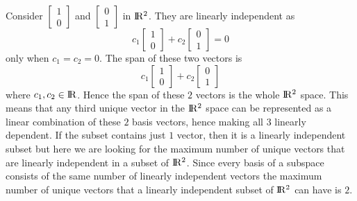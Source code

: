 \documentclass[solution,addpoints,12pt]{exam}
\newenvironment{Solution}{\begin{solution}}{\end{solution}}
\begin{document}
\begin{questions}
    \begin{Solution}
    Consider $\begin{bmatrix}
        1 \\ 0
    \end{bmatrix}$ and $\begin{bmatrix}
        0 \\ 1
    \end{bmatrix}$ in ${\rm I\!R^{2}}$. They are linearly independent as 
    \[c_{1}\begin{bmatrix}
        1 \\ 0
    \end{bmatrix} + c_{2}\begin{bmatrix}
        0 \\ 1
    \end{bmatrix} = 0\] only when $c_{1} = c_{2} = 0$. The span of these two vectors is 
    \[c_{1}\begin{bmatrix}
        1 \\ 0
    \end{bmatrix} + c_{2}\begin{bmatrix}
        0 \\ 1
    \end{bmatrix}\] where $c_{1},c_{2} \in {\rm I\!R}$. Hence the span of these $2$ vectors is the whole ${\rm I\!R^{2}}$ space. This means that any third unique vector in the ${\rm I\!R^{2}}$ space can be represented as a linear combination of these $2$ basis vectors, hence making all $3$ linearly dependent. If the subset contains just $1$ vector, then it is a linearly independent subset but here we are looking for the maximum number of unique vectors that are linearly independent in a subset of ${\rm I\!R^{2}}$. Since every basis of a subspace consists of the same number of linearly independent vectors the maximum number of unique vectors that a linearly independent subset of ${\rm I\!R^{2}}$ can have is $2$.
    \end{Solution}

\question 
\begin{parts}
    

\end{parts}
\end{questions}
\end{document}
